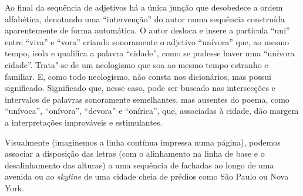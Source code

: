 Ao final da sequência de adjetivos há a única junção que desobedece a
ordem alfabética, denotando uma ``intervenção'' do autor numa sequência
construída aparentemente de forma automática. O autor desloca e insere a
partícula ``uni'' entre ``viva'' e ``vora'' criando sonoramente o
adjetivo ``unívora'' que, ao mesmo tempo, isola e qualifica a palavra
``cidade'', como se pudesse haver uma ``unívora cidade''. Trata"-se de um
neologismo que soa ao mesmo tempo estranho e familiar. E, como todo
neologismo, não consta nos dicionários, mas possui significado.
Significado que, nesse caso, pode ser buscado nas intersecções e
intervalos de palavras sonoramente semelhantes, mas ausentes do poema,
como ``unívoca'', ``onívora'', ``devora'' e ``onírica'', que, associadas
à cidade, dão margem a interpretações improváveis e estimulantes.

Visualmente (imaginemos a linha contínua impressa numa página), podemos
associar a disposição das letras (com o alinhamento na linha de base e o
desalinhamento das alturas) a uma sequência de fachadas ao longo de uma
avenida ou ao \emph{skyline} de uma cidade cheia de prédios como São
Paulo ou Nova York.


